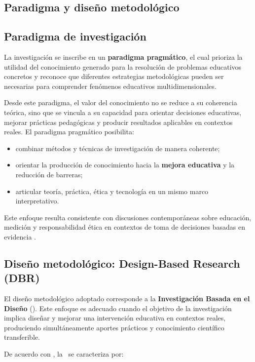 \begin{refsection}
\section{Paradigma y diseño metodológico}

\subsection{Paradigma de investigación}

La investigación se inscribe en un \textbf{paradigma pragmático}, el cual prioriza la utilidad del conocimiento generado para la resolución de problemas educativos concretos y reconoce que diferentes estrategias metodológicas pueden ser necesarias para comprender fenómenos educativos multidimensionales.

Desde este paradigma, el valor del conocimiento no se reduce a su coherencia teórica, sino que se vincula a su capacidad para orientar decisiones educativas, mejorar prácticas pedagógicas y producir resultados aplicables en contextos reales. El paradigma pragmático posibilita:

\begin{itemize}
\item combinar métodos y técnicas de investigación de manera coherente;
\item orientar la producción de conocimiento hacia la \textbf{mejora educativa} y la reducción de barreras;
\item articular teoría, práctica, ética y tecnología en un mismo marco interpretativo.
\end{itemize}

Este enfoque resulta consistente con discusiones contemporáneas sobre educación, medición y responsabilidad ética en contextos de toma de decisiones basadas en evidencia \parencite{biesta2010}.

\subsection{Diseño metodológico: Design-Based Research (DBR)}

El diseño metodológico adoptado corresponde a la \textbf{Investigación Basada en el Diseño} (\DBR). Este enfoque es adecuado cuando el objetivo de la investigación implica diseñar y mejorar una intervención educativa en contextos reales, produciendo simultáneamente aportes prácticos y conocimiento científico transferible.

De acuerdo con \textcite{wang2005}, la \DBR\ se caracteriza por:


\end{refsection}
